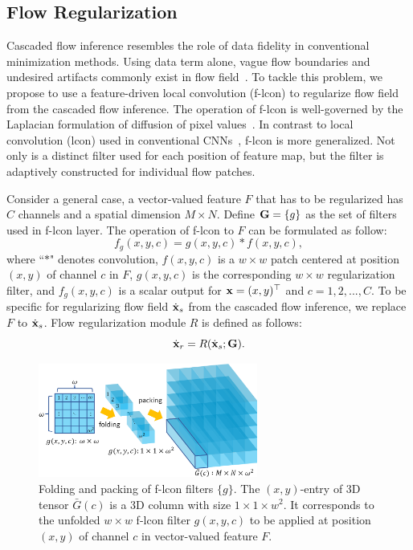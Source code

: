 \documentclass[10pt,twocolumn,letterpaper]{article}
\begin{document}
\subsection{Flow Regularization}
%
Cascaded flow inference resembles the role of data fidelity in conventional minimization methods. Using data term alone, vague flow boundaries and undesired artifacts commonly exist in flow field~\cite{Werlberger09, Zimmer11}. To tackle this problem, we propose to use a feature-driven local convolution (f-lcon) to regularize flow field from the cascaded flow inference. The operation of f-lcon is well-governed by the Laplacian formulation of diffusion of pixel values~\cite{Tschumperle05}.
In contrast to local convolution (lcon) used in conventional CNNs~\cite{Taigman14}, f-lcon is more generalized. Not only is a distinct filter used for each position of feature map, but the filter is adaptively constructed for individual flow patches.

Consider a general case, a vector-valued feature $F$ that has to be regularized has $C$ channels and a spatial dimension $M \times N$. Define ${\bf G} = \{g\}$ as the set of filters used in f-lcon layer. The operation of f-lcon to $F$ can be formulated as follow:
\begin{equation}\label{local convolution1}
  f_{g}(x,y,c) = g(x,y,c) \ast f(x,y,c),
\end{equation}
%
where ``$\ast$"  denotes convolution,  $f(x,y,c)$ is a $w \times w$ patch centered at position $(x,y)$ of channel $c$ in $F$,  $g(x,y,c)$ is the corresponding $w \times w$ regularization filter, and $f_{g}(x,y,c)$ is a scalar output for ${\bf x} = (x,y)^{\top}$ and $c = 1, 2, ..., C$. To be specific for regularizing flow field $\dot{\bf x}_{s}$ from the cascaded flow inference, we replace $F$ to $\dot{\bf x}_{s}$. Flow regularization module $R$ is defined as follows:
\begin{equation}
     \dot{\bf x}_{r} = R(\dot{\bf x}_{s}; {\bf G}).
\end{equation}

\begin{figure}[t]
\centering
   \includegraphics[width=7.2cm]{figure/fold.png}
\caption{Folding and packing of f-lcon filters $\{g\}$. The $(x,y)$-entry of 3D tensor $\bar G(c)$ is a 3D column with size $1 \times 1 \times w^{2}$. It corresponds to the unfolded $w \times w$ f-lcon filter $g(x,y,c)$ to be applied at position $(x,y)$ of channel $c$ in vector-valued feature $F$.}
\label{fig:fold}
\vspace{-1em}
\end{figure}
\end{document}
